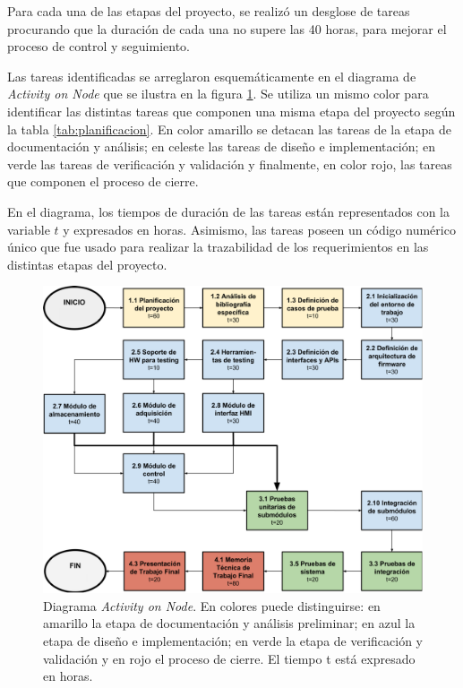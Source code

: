 \vspace{20px}

Para cada una de las etapas del proyecto, se realizó un desglose de tareas procurando que la duración de cada una no supere las 40 horas, para mejorar el proceso de control y seguimiento.

Las tareas identificadas se arreglaron esquemáticamente en el diagrama de \textit{Activity on Node} que se ilustra en la figura \ref{fig:AoN}. Se utiliza un mismo color para identificar las distintas tareas que componen una misma etapa del proyecto según la tabla \ref{tab:planificacion}. En color amarillo se detacan las tareas de la etapa de documentación y análisis; en celeste las tareas de diseño e implementación; en verde las tareas de verificación y validación y finalmente, en color rojo, las tareas que componen el proceso de cierre. 

En el diagrama, los tiempos de duración de las tareas están representados con la variable $t$ y expresados en horas. Asimismo, las tareas poseen un código numérico único que fue usado para realizar la trazabilidad de los requerimientos en las distintas etapas del proyecto.


\begin{figure}[htpb]
	\centering
	\includegraphics[width=\textwidth]{./Figures/AoN.pdf}
	\caption[Diagrama \textit{Activity on Node}.]{Diagrama \textit{Activity on Node}.  En colores puede distinguirse: en amarillo la etapa de documentación y análisis preliminar; en azul la etapa de diseño e implementación; en verde la etapa de verificación y validación y en rojo el proceso de cierre. El tiempo t está expresado en horas.}
	\label{fig:AoN}
\end{figure}

